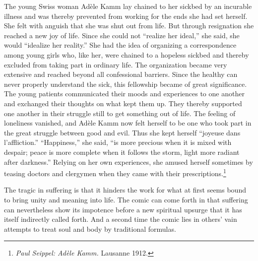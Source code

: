 \documentclass[12pt]{book}
\begin{document}
The young Swiss woman Adèle Kamm lay chained to her sickbed by an incurable illness and
was thereby prevented from working for the ends she had set herself. She felt with
anguish that she was shut out from life. But through resignation she reached a new joy
of life. Since she could not ``realize her ideal,'' she said, she would ``idealize her
reality.'' She had the idea of organizing a correspondence among young girls who, like
her, were chained to a hopeless sickbed and thereby excluded from taking part in
ordinary life. The organization became very extensive and reached beyond all
confessional barriers. Since the healthy can never properly understand the sick, this
fellowship became of great significance. The young patients communicated their moods
and experiences to one another and exchanged their thoughts on what kept them up. They
thereby supported one another in their struggle still to get something out of life. The
feeling of loneliness vanished, and Adèle Kamm now felt herself to be one who took part
in the great struggle between good and evil. Thus she kept herself ``joyeuse dans
l'affliction.'' ``Happiness,'' she said, ``is more precious when it is mixed with
despair; peace is more complete when it follows the storm, light more radiant after
darkness.'' Relying on her own experiences, she amused herself sometimes by teasing
doctors and clergymen when they came with their prescriptions.\footnote{\textit{Paul
Seippel: Adèle Kamm.} Lausanne 1912.}

The tragic in suffering is that it hinders the work for what at first seems bound to
bring unity and meaning into life. The comic can come forth in that suffering can
nevertheless show its impotence before a new spiritual upsurge that it has itself
indirectly called forth. And a second time the comic lies in others' vain attempts to
treat soul and body by traditional formulas.
\end{document}
